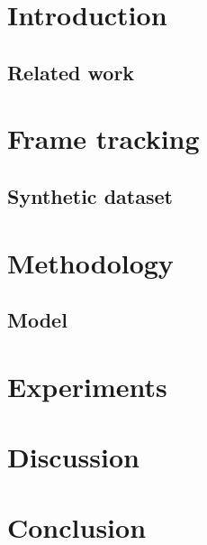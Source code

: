 \date{August 15, 2019}
\maketitle

\chapter{Introduction}


\section{Related work}



\chapter{Frame tracking}


\section{Synthetic dataset}



\chapter{Methodology}
\section{Model}



\chapter{Experiments}



\chapter{Discussion}



\chapter{Conclusion}

